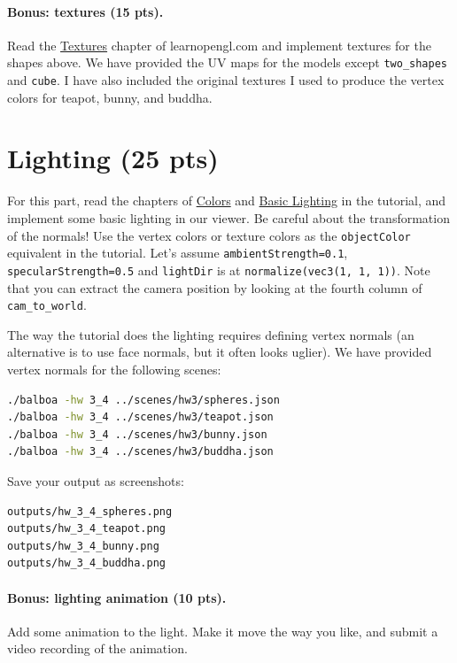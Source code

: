 \paragraph{Bonus: textures (15 pts).} Read the \href{https://learnopengl.com/Getting-started/Textures}{Textures} chapter of learnopengl.com and implement textures for the shapes above. We have provided the UV maps for the models except \lstinline{two_shapes} and \lstinline{cube}. I have also included the original textures I used to produce the vertex colors for teapot, bunny, and buddha.

\section{Lighting (25 pts)}
For this part, read the chapters of \href{https://learnopengl.com/Lighting/Colors}{Colors} and \href{https://learnopengl.com/Lighting/Basic-Lighting}{Basic Lighting} in the tutorial, and implement some basic lighting in our viewer. Be careful about the transformation of the normals! Use the vertex colors or texture colors as the \lstinline{objectColor} equivalent in the tutorial. Let's assume \lstinline{ambientStrength=0.1}, \lstinline{specularStrength=0.5} and \lstinline{lightDir} is at \lstinline{normalize(vec3(1, 1, 1))}. Note that you can extract the camera position by looking at the fourth column of \lstinline{cam_to_world}.

The way the tutorial does the lighting requires defining vertex normals (an alternative is to use face normals, but it often looks uglier). We have provided vertex normals for the following scenes:
\begin{lstlisting}[language=bash]
./balboa -hw 3_4 ../scenes/hw3/spheres.json
./balboa -hw 3_4 ../scenes/hw3/teapot.json
./balboa -hw 3_4 ../scenes/hw3/bunny.json
./balboa -hw 3_4 ../scenes/hw3/buddha.json
\end{lstlisting}

Save your output as screenshots:
\begin{lstlisting}[language=bash]
outputs/hw_3_4_spheres.png
outputs/hw_3_4_teapot.png
outputs/hw_3_4_bunny.png
outputs/hw_3_4_buddha.png
\end{lstlisting}

\paragraph{Bonus: lighting animation (10 pts).} Add some animation to the light. Make it move the way you like, and submit a video recording of the animation.


